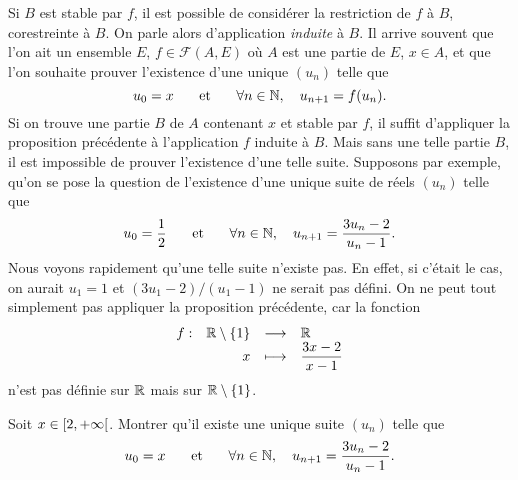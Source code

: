 \documentclass{magnolia}
\begin{document}
\begin{remarques}
\remarque Si $B$ est stable par $f$, il est possible de considérer la restriction de
  $f$ à $B$, corestreinte à $B$. On parle alors d'application \emph{induite} à $B$.
\remarque Il arrive souvent que l'on ait un ensemble $E$,
  $f\in\mathcal{F}(A, E)$ où $A$ est une partie de $E$, $x\in A$, et que l'on souhaite prouver l'existence d'une
  unique $(u_n)$ telle que
  \[u_0=x \quad\quad\!\text{et}\quad\!\quad \forall n\in\mathbb{N},\quad u_{n+1}=f(u_n).\]
  Si on trouve une partie $B$ de $A$ contenant $x$ et stable par $f$, il suffit
  d'appliquer la proposition précédente à l'application $f$ induite à $B$.
  Mais sans une telle partie $B$, il est impossible de prouver l'existence d'une telle suite.
  Supposons par exemple, qu'on se pose la question de l'existence d'une unique  suite
  de réels $(u_n)$ telle que
  \[u_0=\frac{1}{2} \quad\quad\!\text{et}\quad\!\quad \forall n\in\mathbb{N},\quad u_{n+1}=\frac{3 u_n-2}{u_n-1}.\]
  Nous voyons rapidement qu'une telle suite n'existe pas. En effet, si c'était le cas,
  on aurait $u_1=1$ et $(3u_1-2)/(u_1-1)$ ne serait pas défini. On ne peut tout
  simplement pas appliquer la proposition précédente, car la fonction
  \[\begin{array}[t]{lrcl} \displaystyle{f} : & \displaystyle{\mathbb{R}\setminus\left\{1\right\}} & \longrightarrow & \displaystyle{\mathbb{R}} \\ & \displaystyle{x} & \longmapsto & \displaystyle{\frac{3x-2}{x-1}} \end{array}\]
  n'est pas définie sur $\mathbb{R}$ mais sur $\mathbb{R}\setminus\left\{1\right\}$.
\end{remarques}

\begin{exoUnique}
\exo Soit $x\in\left[2,+\infty\right[$. Montrer qu'il existe une unique suite $(u_n)$ telle que
  \[u_0=x \quad\quad\!\text{et}\quad\!\quad \forall n\in\mathbb{N},\quad u_{n+1}=\frac{3 u_n-2}{u_n-1}.\]
\end{exoUnique}




\end{document}
